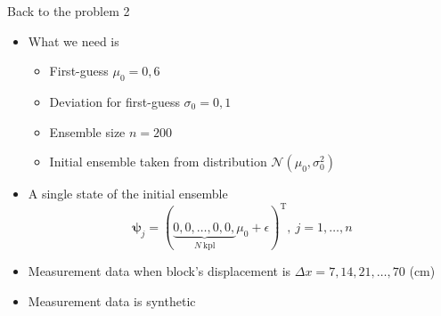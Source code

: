 \documentclass{beamer}
\begin{document}
\begin{frame}{Back to the problem 2}

\begin{itemize}
\item What we need is
\begin{itemize}
\item First-guess $\mu_0=0{,}6$
\item Deviation for first-guess $\sigma_0 = 0{,}1$
\item Ensemble size $n=200$
\item Initial ensemble taken from distribution $\mathcal{N}(\mu_0,\sigma_0^2)$
\end{itemize}
\item A single state of the initial ensemble
\[
\boldsymbol{\psi}_j = (\underbrace{0, 0, \dots, 0, 0,}_{N~\text{kpl}} \mu_0 + \epsilon )^\mathrm{T},~j=1,\dots,n
\]
\item Measurement data when block's displacement is $\Delta x = 7,14,21,\dots,70$ (cm)
\item Measurement data is synthetic
\end{itemize}


\end{frame}
\end{document}
